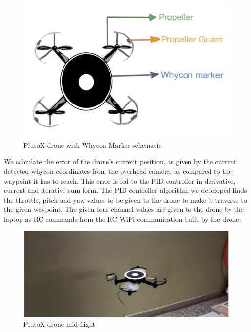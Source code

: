 \begin{figure}[H]
    \centering
    \includegraphics[scale=0.6]{SummerInterReport/project/Images-Major/whycon_plutox.png}
    \caption{PlutoX drone with Whycon Marker schematic}
    \label{fig:plutox_whycon}
\end{figure}
We calculate the error of the drone's current position, as given by the current detected whycon coordinates from the overhead camera, as compared to the waypoint it has to reach. This error is fed to the PID controller in derivative, current and iterative sum form. The PID controller algorithm we developed finds the throttle, pitch and yaw values to be given to the drone to make it traverse to the given waypoint. The given four channel values are given to the drone by the laptop as RC commands from the RC WiFi communication built by the drone.
\\
\begin{figure}[H]
    \centering
    \includegraphics[]{SummerInterReport/project/Images-Major/Flying_pluto.png}
    \caption{PlutoX drone mid-flight}
    \label{fig:plutox_flying}
\end{figure}


